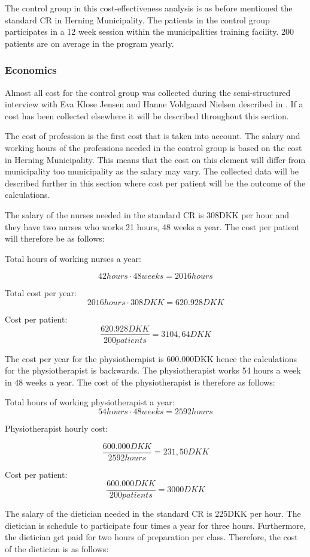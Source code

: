 The control group in this cost-effectiveness analysis is as before mentioned the standard CR in Herning Municipality. The  patients in the control group participates in a 12 week session within the municipalities training facility. 200 patients are on average in the program yearly.

\subsubsection{Economics}
Almost all cost for the control group was collected during the semi-structured interview with Eva Klose Jensen and Hanne Voldgaard Nielsen described in . If a cost has been collected elsewhere it will be described throughout this section. 

The cost of profession is the first cost that is taken into account.
The salary and working hours of the professions needed in the control group is based on the cost in Herning Municipality. This means that the cost on this element will differ from municipality too municipality as the salary may vary.  The collected data will be described further in this section where cost per patient will be the outcome of the calculations. 


The salary of the nurses needed in the standard CR is 308DKK per hour and they have two nurses who works 21 hours, 48 weeks a year. The cost per patient will therefore be as follows:

Total hours of working nurses a year:

$$42hours\cdot48weeks=2016hours$$

Total cost per year:
$$2016hours\cdot308DKK=620.928DKK$$

Cost per patient:
$$\frac{620.928DKK}{200patients}=3104,64DKK$$

The cost per year for the physiotherapist is 600.000DKK hence the calculations for the physiotherapist is backwards. The physiotherapist works 54 hours a week in 48 weeks a year. The cost of the physiotherapist is therefore as follows:

Total hours of working physiotherapist a year:
$$54hours\cdot48weeks=2592hours$$

Physiotherapist hourly cost:

$$\frac{600.000DKK}{2592hours}=231,50DKK$$

Cost per patient:
$$\frac{600.000DKK}{200patients}=3000DKK$$

The salary of the dietician needed in the standard CR is 225DKK per hour. The dietician is schedule to participate four times a year for three hours. Furthermore, the dietician get paid for two hours of preparation per class. Therefore, the cost of the dietician is as follows:

